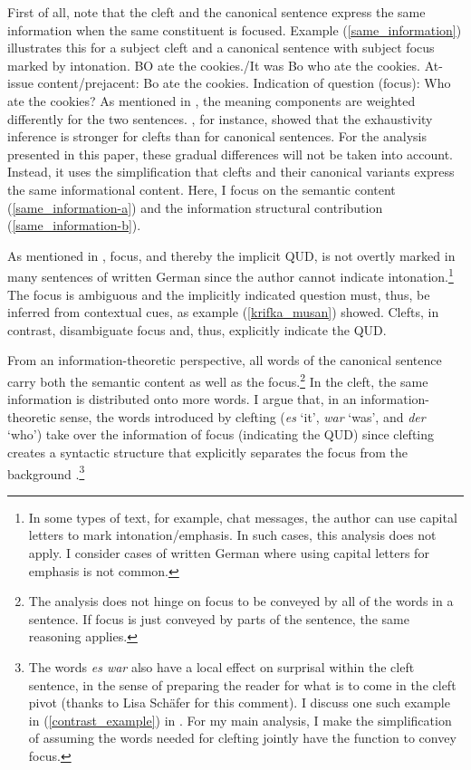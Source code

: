 \documentclass[output=paper,colorlinks,citecolor=brown]{langscibook}
\begin{document}
First of all, note that the cleft and the canonical sentence express the same information when the same constituent is focused. Example (\ref{same_information}) illustrates this for a subject cleft and a canonical sentence with subject focus marked by intonation.
\ea\label{same_information} BO ate the cookies./It was Bo who ate the cookies.
\ea\label{same_information-a}{At-issue content/prejacent: Bo ate the cookies.}
\ex\label{same_information-b}{Indication of question (focus): Who ate the cookies?}
\z
\z
As mentioned in , the meaning components are weighted differently for the two sentences. \citet{deveaugh-geiss_et_al_2018b}, for instance, showed that the exhaustivity inference is stronger for clefts than for canonical sentences. For the analysis presented in this paper, these gradual differences will not be taken into account. Instead, it uses the simplification that clefts and their canonical variants express the same informational content. Here, I focus on the semantic content (\ref{same_information-a}) and the information structural contribution (\ref{same_information-b}). 

As mentioned in , focus, and thereby the implicit QUD, is not overtly marked in many sentences of written German since the author cannot indicate intonation.\footnote{In some types of text, for example, chat messages, the author can use capital letters to mark intonation/emphasis. In such cases, this analysis does not apply. I consider cases of written German where using capital letters for emphasis is not common.} The focus is ambiguous and the implicitly indicated question must, thus, be inferred from contextual cues, as example (\ref{krifka_musan}) showed.  Clefts, in contrast, disambiguate focus and, thus, explicitly indicate the QUD. 

From an information-theoretic perspective, all words of the canonical sentence carry both the semantic content as well as the focus.\footnote{The analysis does not hinge on focus to be conveyed by all of the words in a sentence. If focus is just conveyed by parts of the sentence, the same reasoning applies.} In the cleft, the same information is distributed onto more words. I argue that, in an information-theoretic sense, the words introduced by clefting (\textit{es} `it', \textit{war} `was', and \textit{der} `who') take over the information of focus (indicating the QUD) since clefting creates a syntactic structure that explicitly separates the focus from the background \citep[see also][]{e.kiss_1998}.\footnote{The words \textit{es war} also have a local effect on surprisal within the cleft sentence, in the sense of preparing the reader for what is to come in the cleft pivot (thanks to Lisa Sch\"afer for this comment). I discuss one such example in (\ref{contrast_example}) in . For my main analysis, I make the simplification of assuming the words needed for clefting jointly have the function to convey focus.} 
\end{document}
